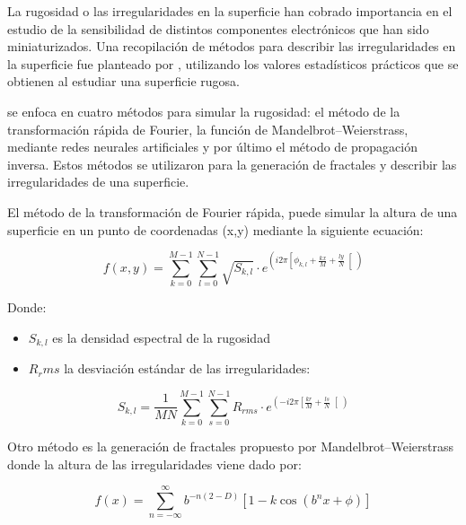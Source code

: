 \documentclass[main]{subfiles}
\begin{document}
La rugosidad o las irregularidades en la superficie han cobrado importancia en el estudio de la sensibilidad de distintos componentes electrónicos que han sido miniaturizados. Una recopilación de métodos para describir las irregularidades en la superficie fue planteado por \citet{Patrikar2004213}, utilizando los valores estadísticos prácticos que se obtienen al estudiar una superficie rugosa.
  
\citet{Patrikar2004213} se enfoca en cuatro métodos para simular la rugosidad: el método de la transformación rápida de Fourier, la función de Mandelbrot–Weierstrass, mediante redes neurales artificiales y por último el método de propagación inversa. Estos métodos se utilizaron para la generación de fractales y describir las irregularidades de una superficie. 

El método de la transformación de Fourier rápida, puede simular la altura de una superficie en un punto de coordenadas (x,y) mediante la siguiente ecuación:


\begin{equation}
f(x,y)=\sum_{k=0}^{M-1}\sum_{l=0}^{N-1}\sqrt{S_{k,l}}
\cdot e^{\left( i2\pi \left[ 
\phi_{k,l}+\frac{kx}{M}+\frac{ly}{N}
\right[ \right)}
\end{equation}

\par \hspace{1cm}
\begin{minipage}{10cm}
\begin{spacing}{0.5}
Donde:
\begin{itemize}
\item $S_{k,l}$ es la densidad espectral de la rugosidad
\item $R_rms$ la desviación estándar de las irregularidades:
\end{itemize}
\end{spacing}
\end{minipage}


\begin{equation}
S_{k,l}=\frac{1}{MN}\sum_{k=0}^{M-1}\sum_{s=0}^{N-1} R_{rms}
\cdot e^{\left( -i2\pi \left[ 
\frac{kr}{M}+\frac{ls}{N}
\right[ \right)}
\end{equation}

Otro método es la generación de fractales propuesto por Mandelbrot–Weierstrass donde la altura de las irregularidades viene dado por:

 \begin{equation}
f(x)=\sum_{n=-\infty}^{\infty} b^{-n(2-D)} [1-k\cos(b^nx+\phi)]
\end{equation}
  
\end{document}
